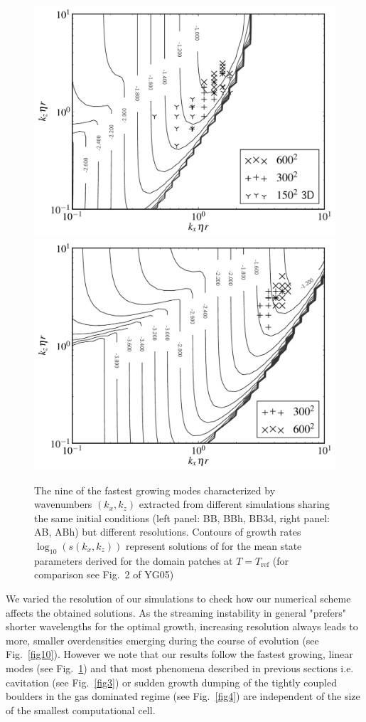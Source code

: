 \begin{figure}
  \includegraphics[width=0.48\linewidth]{figures/fig9a}
  \includegraphics[width=0.48\linewidth]{figures/fig9b}
  \caption{
     The nine of the fastest growing modes characterized by wavenumbers
     $(k_x, k_z)$ extracted  from different simulations sharing the
     same initial conditions (left panel: BB, BBh, BB3d, right panel: AB, ABh)
     but different resolutions. Contours of growth rates $\log_{10}( s(k_x,
     k_z))$  represent solutions of  for the mean state
     parameters derived for  the domain patches at $T = T_{\textrm{ref}}$
  (for comparison see Fig.~2 of YG05)}
   \label{fig9}
\end{figure}
 
We varied the resolution of our simulations to check how our numerical scheme
affects the obtained solutions. As the streaming instability in general
"prefers" shorter wavelengths for the optimal growth, increasing resolution
always leads to more, smaller overdensities emerging during the course of
evolution (see Fig.~\ref{fig10}). However we note that our results
follow the fastest growing, linear modes (see Fig.~\ref{fig9}) and
that most phenomena described in previous sections i.e. cavitation (see
Fig.~\ref{fig3}) or sudden growth dumping of the tightly coupled
boulders in the gas dominated regime (see Fig.~\ref{fig4}) are independent of
the size of the smallest computational cell.

